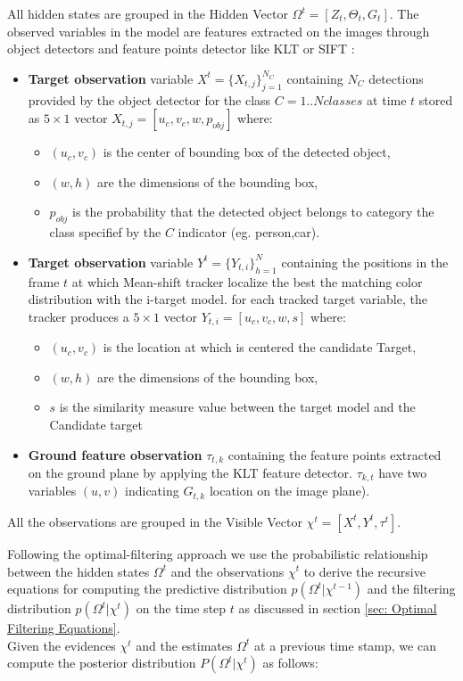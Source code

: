 All hidden states are grouped in the Hidden Vector $\Omega^{t} = [Z_{t}, \Theta_{t}, G_{t}]$.
The observed variables in the model are features extracted on the images through object detectors and feature points detector like KLT or SIFT :
\begin{itemize}
\item \textbf{Target observation} variable $X^t =\{X_{t,j}\}_{j=1}^{N_{C}}$ containing $N_{C}$ detections provided by the object detector for the class $C=1..Nclasses$ at time $t$ stored as $5\times1$ vector $X_{t,j}= [u_c,v_c,w,p_{obj}]$ where:
\begin{itemize}
\item $(u_c,v_c)$ is the center of bounding box of the detected object,
\item $(w, h)$ are the dimensions of the bounding box,
\item $p_{obj}$ is the probability that the detected object belongs to category the class specifief by the $C$ indicator (eg. person,car).
\end{itemize}
\item \textbf{Target observation} variable $Y^t  = \{Y_{t,i} \}_{h=1}^{N}$ containing the positions in the frame $t$ at which Mean-shift tracker localize the best the matching color distribution with the i-target model.
for each tracked target variable, the tracker produces a $5\times1$ vector $Y_{t,i}= [u_c,v_c,w,s]$ where:
\begin{itemize}
\item $(u_c,v_c)$ is the location at which is centered the candidate Target,
\item $(w, h)$ are the dimensions of the bounding box,
\item $s$ is the similarity measure value between the target model and the Candidate target 
\end{itemize}
\item \textbf{Ground feature observation} $\tau_{t,k}$ containing the feature points extracted on the ground plane by applying the KLT feature detector. $\tau_{k,t}$ have two variables $(u,v)$ indicating $G_{t,k}$ location on the image plane). 
\end{itemize}
All the observations are grouped in the Visible Vector $\chi^t = [X^t , Y^t , \tau^{t}]$.

Following the optimal-filtering approach we use the probabilistic relationship between the hidden states $\Omega^{t}$ and the observations $\chi^t$ to derive the recursive equations for computing the predictive distribution $p(\Omega^{t} |\chi^{t-1})$ and the filtering distribution $p(\Omega^{t} |\chi^{t} )$ on the time step $t$ as discussed in section \ref{sec: Optimal Filtering Equations}.\\
Given the evidences $\chi^t$ and the estimates $\Omega^{t}$ at a previous time stamp, we
can compute the posterior distribution $P(\Omega^{t} |\chi^t )$ as follows:

